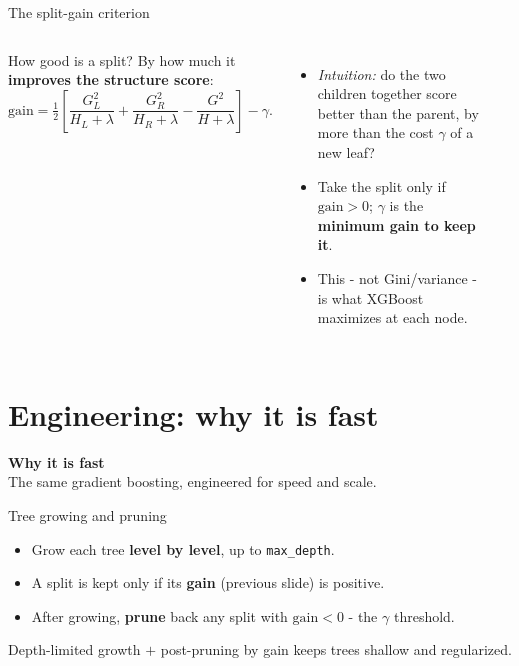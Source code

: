 \documentclass[aspectratio=169]{beamer}
\newcommand{\sectiontransition}[2]{%
  \begin{frame}[plain]
    \vfill
    \begin{center}
      {\Large\color{popblue}\textbf{#1}}\\[10pt]
      {\normalsize #2}
    \end{center}
    \vfill
  \end{frame}}
\begin{document}
\begin{frame}{The split-gain criterion}
  \begin{columns}[T]
    How good is a split? By how much it \textbf{improves the structure score}:
    \[
      \mathrm{gain} = \tfrac12\!\left[ \frac{G_L^2}{H_L+\lambda} + \frac{G_R^2}{H_R+\lambda}
        - \frac{G^2}{H+\lambda} \right] - \gamma .
    \]
    \begin{itemize}\small
      \item \emph{Intuition:} do the two children together score better than the parent, by more
        than the cost $\gamma$ of a new leaf?
      \item Take the split only if $\mathrm{gain} > 0$; $\gamma$ is the \textbf{minimum gain to keep it}.
      \item This - not Gini/variance - is what XGBoost maximizes at each node.
    \end{itemize}
    \begin{center}
    \end{center}
  \end{columns}
\end{frame}

\section{Engineering: why it is fast}
\sectiontransition{Why it is fast}{The same gradient boosting, engineered for speed and scale.}

\begin{frame}{Tree growing and pruning}
  \begin{itemize}
    \item Grow each tree \textbf{level by level}, up to \texttt{max\_depth}.
    \item A split is kept only if its \textbf{gain} (previous slide) is positive.
    \item After growing, \textbf{prune} back any split with $\mathrm{gain} < 0$ - the $\gamma$ threshold.
  \end{itemize}
  \vfill
  \footnotesize Depth-limited growth $+$ post-pruning by gain keeps trees shallow and regularized.
\end{frame}
\end{document}
